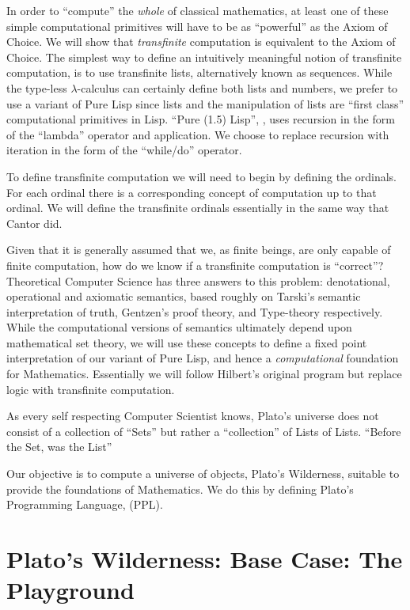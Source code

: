 In order to ``compute'' the \emph{whole} of classical mathematics, at least one
of these simple computational primitives will have to be as ``powerful'' as the
Axiom of Choice. We will show that \emph{transfinite} computation is equivalent
to the Axiom of Choice. The simplest way to define an intuitively meaningful
notion of transfinite computation, is to use transfinite lists, alternatively
known as sequences. While the type-less $\lambda$-calculus can certainly define
both lists and numbers, we prefer to use a variant of Pure Lisp since lists and
the manipulation of lists are ``first class'' computational primitives in Lisp.
``Pure (1.5) Lisp'', \cite{mcCarthy1960lisp}, uses recursion in the form of the
``lambda'' operator and application. We choose to replace recursion with
iteration in the form of the ``while/do'' operator.

To define transfinite computation we will need to begin by defining the
ordinals. For each ordinal there is a corresponding concept of computation up to
that ordinal. We will define the transfinite ordinals essentially in the same
way that Cantor did. 

Given that it is generally assumed that we, as finite beings, are only capable
of finite computation, how do we know if a transfinite computation is
``correct''? Theoretical Computer Science has three answers to this problem:
denotational, operational and axiomatic semantics, based roughly on Tarski's
semantic interpretation of truth, Gentzen's proof theory, and Type-theory
respectively. While the computational versions of semantics ultimately depend
upon mathematical set theory, we will use these concepts to define a fixed point
interpretation of our variant of Pure Lisp, and hence a \emph{computational}
foundation for Mathematics. Essentially we will follow Hilbert's original
program but replace logic with transfinite computation.

\begin{myQuote}
As every self respecting Computer Scientist knows, Plato's universe does not
consist of a collection of ``Sets'' but rather a ``collection'' of Lists of
Lists. \quad ``Before the Set, was the List''
\end{myQuote}

Our objective is to compute a universe of objects, Plato's Wilderness, suitable
to provide the foundations of Mathematics. We do this by defining Plato's
Programming Language, (PPL).

\section{Plato's Wilderness: Base Case: The Playground}

